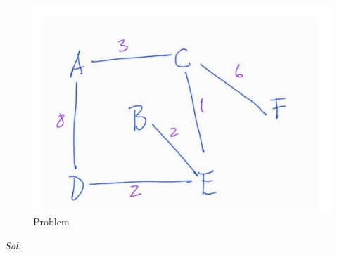 \documentclass{assignment}
\begin{document}
\begin{figure}[h]
  \begin{center}
    
  \includegraphics[scale=0.5]{figures/2.png}
\caption{Problem}
  \end{center}
\end{figure}
\textit{ Sol. }
\end{document}
